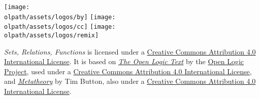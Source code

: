 \documentclass[a4paper]{memoir}
\newcommand{\olpath}{../../}
\begin{document}

\begin{titlingpage}

\vfill

\begin{minipage}[b]{.9cm}
    \texttt{[image: \\olpath/assets/logos/by]}
    \texttt{[image: \\olpath/assets/logos/cc]}
    \texttt{[image: \\olpath/assets/logos/remix]}
    \end{minipage}
    \hspace{.3cm}
    \begin{minipage}[b]{6.5cm}
    \ollicensefont
    \textit{Sets, Relations, Functions} is licensed under a
    \href{http://creativecommons.org/licenses/by/4.0/}{Creative Commons
      Attribution 4.0 International License}. It is based on
    \textit{\href{https://github.com/OpenLogicProject/OpenLogic}{The Open
        Logic Text}} by the \href{http://openlogicproject.org/}{Open Logic
      Project}, used under a
    \href{http://creativecommons.org/licenses/by/4.0/}{Creative Commons
      Attribution 4.0 International License}, and \textit{\href{http://people.ds.cam.ac.uk/tecb2/metatheory.shtml}{Metatheory}} by Tim Button, also under a \href{http://creativecommons.org/licenses/by/4.0/}{Creative Commons
      Attribution 4.0 International License}.
    \end{minipage}
\end{titlingpage}

\frontmatter
\pagestyle{ruled}
\end{document}
